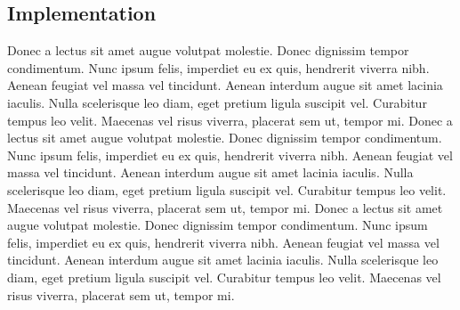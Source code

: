 \documentclass{article}
\begin{document}
\subsection{Implementation}
Donec a lectus sit amet augue volutpat molestie. Donec dignissim tempor condimentum. Nunc ipsum felis, imperdiet
eu ex quis, hendrerit viverra nibh. Aenean feugiat vel massa vel tincidunt. Aenean interdum augue sit amet lacinia
iaculis. Nulla scelerisque leo diam, eget pretium ligula suscipit vel. Curabitur tempus leo velit. Maecenas vel
risus viverra, placerat sem ut, tempor mi.
Donec a lectus sit amet augue volutpat molestie. Donec dignissim tempor condimentum. Nunc ipsum felis, imperdiet
eu ex quis, hendrerit viverra nibh. Aenean feugiat vel massa vel tincidunt. Aenean interdum augue sit amet lacinia
iaculis. Nulla scelerisque leo diam, eget pretium ligula suscipit vel. Curabitur tempus leo velit. Maecenas vel
risus viverra, placerat sem ut, tempor mi.
\vspace{5mm}
\newline
Donec a lectus sit amet augue volutpat molestie. Donec dignissim tempor condimentum. Nunc ipsum felis, imperdiet
eu ex quis, hendrerit viverra nibh. Aenean feugiat vel massa vel tincidunt. Aenean interdum augue sit amet lacinia
iaculis. Nulla scelerisque leo diam, eget pretium ligula suscipit vel. Curabitur tempus leo velit. Maecenas vel
risus viverra, placerat sem ut, tempor mi.
\end{document}
